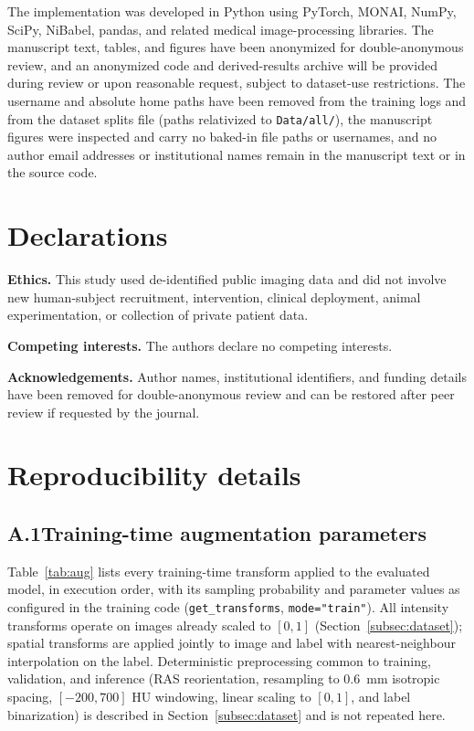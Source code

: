 \documentclass[anonymous]{iopjournal}
\begin{document}
The implementation was developed in Python using PyTorch, MONAI, NumPy, SciPy, NiBabel, pandas, and related medical image-processing libraries. The manuscript text, tables, and figures have been anonymized for double-anonymous review, and an anonymized code and derived-results archive will be provided during review or upon reasonable request, subject to dataset-use restrictions. The username and absolute home paths have been removed from the training logs and from the dataset splits file (paths relativized to \texttt{Data/all/}), the manuscript figures were inspected and carry no baked-in file paths or usernames, and no author email addresses or institutional names remain in the manuscript text or in the source code.

\section*{Declarations}

\textbf{Ethics.} This study used de-identified public imaging data and did not involve new human-subject recruitment, intervention, clinical deployment, animal experimentation, or collection of private patient data.

\textbf{Competing interests.} The authors declare no competing interests.

\textbf{Acknowledgements.} Author names, institutional identifiers, and funding details have been removed for double-anonymous review and can be restored after peer review if requested by the journal.

\appendix

\section{Reproducibility details}
\label{app:repro}

\subsection*{A.1\quad Training-time augmentation parameters}

Table~\ref{tab:aug} lists every training-time transform applied to the evaluated model, in execution order, with its sampling probability and parameter values as configured in the training code (\texttt{get\_transforms}, \texttt{mode="train"}). All intensity transforms operate on images already scaled to $[0,1]$ (Section~\ref{subsec:dataset}); spatial transforms are applied jointly to image and label with nearest-neighbour interpolation on the label. Deterministic preprocessing common to training, validation, and inference (RAS reorientation, resampling to \SI{0.6}{mm} isotropic spacing, $[-200,700]$ HU windowing, linear scaling to $[0,1]$, and label binarization) is described in Section~\ref{subsec:dataset} and is not repeated here.
\end{document}
